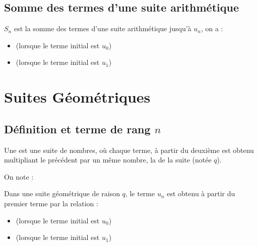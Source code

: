 \documentclass[12pt,a4paper]{article}
\begin{document}
\subsection{Somme des termes d'une suite arithmétique}




\begin{mybilan}
	 $S_n$ est la somme des termes d'une suite arithmétique jusqu'à $u_n$, on a :
	\begin{itemize}
		\item {} (lorsque le terme initial est $u_0$) 
		\item {} (lorsque le terme initial est $u_1$)
	\end{itemize}
\end{mybilan}


\newpage

\section{Suites Géométriques}

\subsection{Définition et terme de rang $n$}




\begin{mybilan}
	
	
	Une  est une suite de nombres, où chaque terme, à partir du deuxième est obtenu multipliant le précédent par un même nombre, la  de la suite (notée $q$).	
	
	On note :
	
	Dans une suite géométrique de raison $q$, le terme $u_n$ est obtenu à partir du premier terme par la relation :
	\begin{itemize}
		\item {} (lorsque le terme initial est $u_0$) 
		\item {} (lorsque le terme initial est $u_1$)
	\end{itemize}
	
%	
\end{mybilan}
\end{document}
